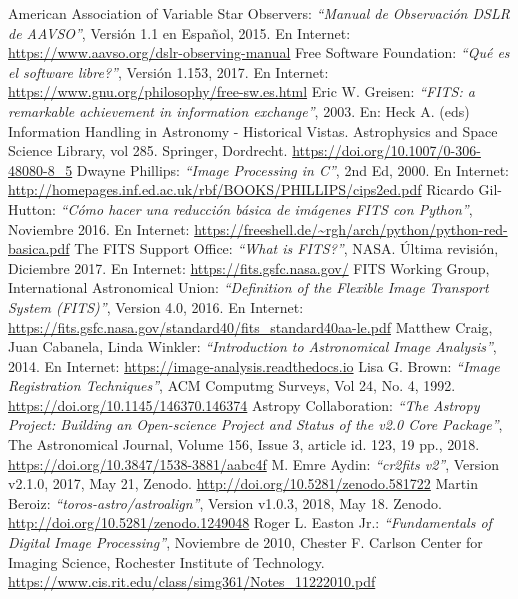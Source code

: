 \documentclass[a4paper, 12pt]{article}
\begin{document}
\begin{thebibliography}{100}
 American Association of Variable Star Observers: {\it ``Manual de Observación DSLR de AAVSO''}, Versión 1.1 en Español, 2015. En Internet: \url{https://www.aavso.org/dslr-observing-manual}
   Free Software Foundation: {\it ``Qué es el software libre?''}, Versión 1.153, 2017. En Internet: \url{https://www.gnu.org/philosophy/free-sw.es.html}
 Eric W. Greisen: {\it ``FITS: a remarkable achievement in information exchange''}, 2003. En: Heck A. (eds) Information Handling in Astronomy - Historical Vistas. Astrophysics and Space Science Library, vol 285. Springer, Dordrecht. \url{https://doi.org/10.1007/0-306-48080-8_5}
 Dwayne Phillips: {\it ``Image Processing in C''}, 2nd Ed, 2000. En Internet: \url{http://homepages.inf.ed.ac.uk/rbf/BOOKS/PHILLIPS/cips2ed.pdf}
 Ricardo Gil-Hutton: {\it ``Cómo hacer una reducción básica de imágenes FITS con Python''}, Noviembre 2016. En Internet: \url{https://freeshell.de/~rgh/arch/python/python-red-basica.pdf}
 The FITS Support Office: {\it ``What is FITS?''}, NASA. Última revisión, Diciembre 2017.  En Internet: \url{https://fits.gsfc.nasa.gov/}
 FITS Working Group, International Astronomical Union: {\it ``Definition of the Flexible Image Transport System (FITS)''}, Version 4.0, 2016. En Internet: \url{https://fits.gsfc.nasa.gov/standard40/fits_standard40aa-le.pdf}
 Matthew Craig, Juan Cabanela, Linda Winkler: {\it ``Introduction to Astronomical Image Analysis''}, 2014. En Internet: \url{https://image-analysis.readthedocs.io}
 Lisa G. Brown: {\it ``Image Registration Techniques''}, ACM Computmg Surveys, Vol 24, No. 4, 1992. \url{https://doi.org/10.1145/146370.146374}
 Astropy Collaboration: {\it ``The Astropy Project: Building an Open-science Project and Status of the v2.0 Core Package''}, The Astronomical Journal, Volume 156, Issue 3, article id. 123, 19 pp., 2018. \url{https://doi.org/10.3847/1538-3881/aabc4f}
  M. Emre Aydin: {\it ``cr2fits v2''}, Version v2.1.0, 2017, May 21, Zenodo. \url{http://doi.org/10.5281/zenodo.581722}
 Martin Beroiz: {\it ``toros-astro/astroalign''}, Version v1.0.3, 2018, May 18. Zenodo. \url{http://doi.org/10.5281/zenodo.1249048}
 Roger L. Easton Jr.: {\it ``Fundamentals of Digital Image Processing''}, Noviembre de 2010, Chester F. Carlson Center for Imaging Science, Rochester Institute of Technology. \url{https://www.cis.rit.edu/class/simg361/Notes_11222010.pdf}
\end{thebibliography}
\end{document}
